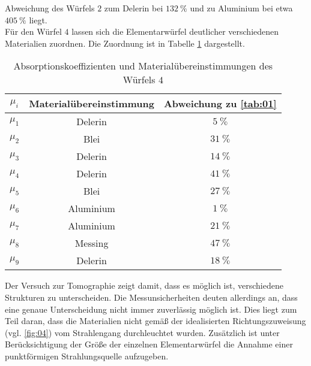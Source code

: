 Abweichung des Würfels $2$ zum Delerin bei $\SI{132}{\percent}$ und zu Aluminium
bei etwa $\SI{405}{\percent}$ liegt.  \\
\noindent Für den Würfel $4$ lassen sich die Elementarwürfel deutlicher
verschiedenen Materialien zuordnen. Die Zuordnung ist in Tabelle \ref{tab:02}
dargestellt.
\FloatBarrier
\begin{table}
  \centering
  \caption{Absorptionskoeffizienten und Materialübereinstimmungen des Würfels $4$}
  \label{tab:02}
  \begin{tabular}{c c c}
    \toprule
   \multicolumn{1}{c}{$\mu_i$} & \multicolumn{1}{c}{Materialübereinstimmung }
   & \multicolumn{1}{c}{Abweichung zu \ref{tab:01}}  \\
   \midrule
    $\mu_1$ & Delerin &   $\SI{5}{\percent} $\\
    $\mu_2$ & Blei &      $\SI{31}{\percent}$ \\
    $\mu_3$ & Delerin &   $\SI{14}{\percent}$ \\
    $\mu_4$ & Delerin &   $\SI{41}{\percent}$ \\
    $\mu_5$ & Blei &      $\SI{27}{\percent}$ \\
    $\mu_6$ & Aluminium & $\SI{1}{\percent} $\\
    $\mu_7$ & Aluminium & $\SI{21}{\percent}$ \\
    $\mu_8$ & Messing &   $\SI{47}{\percent}$ \\
    $\mu_9$ & Delerin &   $\SI{18}{\percent}$ \\
\bottomrule
  \end{tabular}
\end{table}
\FloatBarrier
\noindent Der Versuch zur Tomographie zeigt damit, dass es möglich ist,
verschiedene Strukturen zu unterscheiden. Die Messunsicherheiten deuten allerdings
an, dass eine genaue Unterscheidung nicht immer zuverlässig möglich ist. Dies
liegt zum Teil daran, dass die Materialien nicht gemäß der idealisierten
Richtungszuweisung (vgl. \ref{fig:04}) vom Strahlengang durchleuchtet wurden.
Zusätzlich ist unter Berücksichtigung der Größe der einzelnen Elementarwürfel
die Annahme einer punktförmigen Strahlungsquelle aufzugeben.
